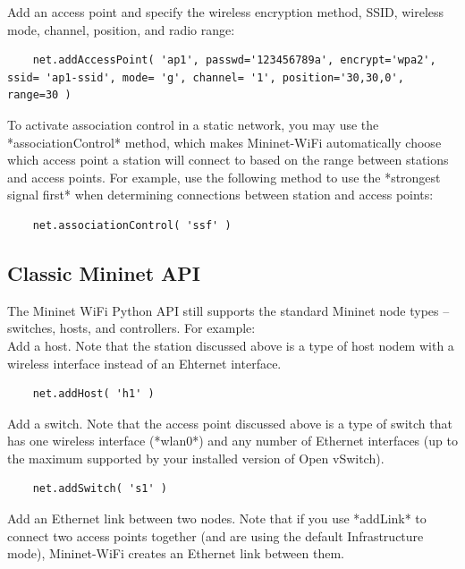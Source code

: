 \noindent Add an access point and specify the wireless encryption method, SSID, wireless mode, channel, position, and radio range:

\begin{verbatim}
    net.addAccessPoint( 'ap1', passwd='123456789a', encrypt='wpa2', ssid= 'ap1-ssid', mode= 'g', channel= '1', position='30,30,0', range=30 )
\end{verbatim}    

To activate association control in a static network, you may use the *associationControl* method, which makes Mininet-WiFi automatically choose which access point a station will connect to based on the range between stations and access points. For example, use the following method to use the *strongest signal first* when determining connections between station and access points:

\begin{verbatim}
    net.associationControl( 'ssf' )
\end{verbatim}
    
\subsection{Classic Mininet API}

The Mininet WiFi Python API still supports the standard Mininet node types -- switches, hosts, and controllers. For example:\\

\noindent Add a host. Note that the station discussed above is a type of host nodem with a wireless interface instead of an Ehternet interface.

\begin{verbatim}
    net.addHost( 'h1' )
\end{verbatim}
    

\noindent Add a switch. Note that the access point discussed above is a type of switch that has one wireless interface (*wlan0*) and any number of Ethernet interfaces (up to the maximum supported by your installed version of Open vSwitch).

\begin{verbatim}
    net.addSwitch( 's1' )
\end{verbatim}
    

\noindent Add an Ethernet link between two nodes. Note that if you use *addLink* to connect two access points together (and are using the default Infrastructure mode), Mininet-WiFi creates an Ethernet link between them.

